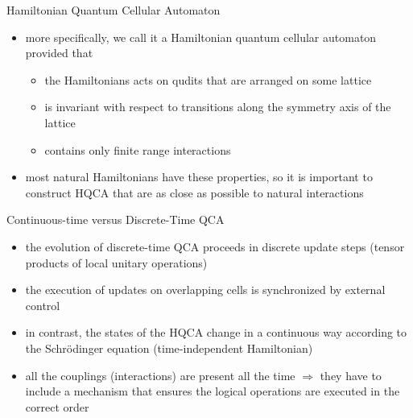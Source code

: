 \documentclass[slideColor]{prosper}
\renewcommand{\>}{\rangle}
\newcommand{\<}{\langle}
\begin{document}
\begin{slide}{Hamiltonian Quantum Cellular Automaton}

\begin{itemize}
\item more specifically, we call it a Hamiltonian quantum cellular automaton provided that 
\begin{itemize}

\medskip
\item the Hamiltonians acts on qudits that are arranged on some lattice

\medskip
\item is invariant with respect to transitions along the symmetry axis of the lattice

\medskip
\item contains only finite range interactions
\end{itemize}

\medskip
\item most natural Hamiltonians have these properties, so it is important to construct HQCA that are as close as possible to natural interactions
\end{itemize}

\end{slide}


\begin{slide}{Continuous-time versus Discrete-Time QCA}
\begin{itemize}
\medskip
\item the evolution of discrete-time QCA proceeds in discrete update steps (tensor products of local unitary operations)

\medskip
\item the execution of updates on overlapping cells is synchronized by external control

\medskip
\item in contrast, the states of the HQCA change in a continuous way according to the Schr\"odinger equation (time-independent Hamiltonian)

\medskip
\item all the couplings (interactions) are present all the time $\Rightarrow$ they have to include a mechanism that ensures the logical operations are executed in the correct order
\end{itemize}
\end{slide}

\end{document}

